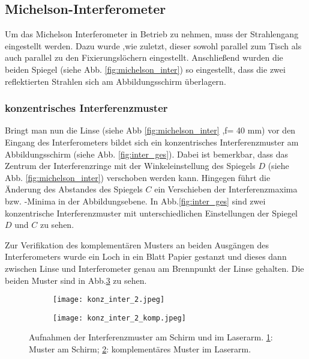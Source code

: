 \subsection{Michelson-Interferometer}
Um das Michelson Interferometer in Betrieb zu nehmen, muss der Strahlengang eingestellt werden.
Dazu wurde ,wie zuletzt, dieser sowohl parallel zum Tisch als auch parallel zu den Fixierungslöchern eingestellt.
Anschließend wurden die beiden Spiegel (siehe Abb. \ref{fig:michelson_inter}) so eingestellt, dass die zwei reflektierten Strahlen sich am Abbildungsschirm überlagern.
\subsubsection{konzentrisches Interferenzmuster}
Bringt man nun die Linse (siehe Abb \ref{fig:michelson_inter} ,f= 40 mm) vor den Eingang des Interferometers bildet sich ein konzentrisches Interferenzmuster am Abbildungsschirm (siehe Abb. \ref{fig:inter_ges}).
Dabei ist bemerkbar, dass das Zentrum der Interferenzringe mit der Winkeleinstellung des Spiegels $D$ (siehe Abb. \ref{fig:michelson_inter}) verschoben werden kann. 
Hingegen führt die Änderung des Abstandes des Spiegels $C$ ein Verschieben der Interferenzmaxima bzw. -Minima in der Abbildungsebene.
In Abb.\ref{fig:inter_ges} sind zwei konzentrische Interferenzmuster mit unterschiedlichen Einstellungen der Spiegel $D$ und $C$ zu sehen.

Zur Verifikation des komplementären Musters an beiden Ausgängen des Interferometers wurde ein Loch in ein Blatt Papier gestanzt und dieses dann zwischen Linse und Interferometer genau am Brennpunkt der Linse gehalten.
Die beiden Muster sind in Abb.\ref{fig:konz_inter_2} zu sehen.

\begin{figure}[H]
    \centering
    \begin{subfigure}[t]{0.45\textwidth}
        \texttt{[image: konz\_inter\_2.jpeg]}
        \caption{}
        \label{fig:konz_inter_2_schirm}
    \end{subfigure}
    \begin{subfigure}[t]{0.45\textwidth}
        \texttt{[image: konz\_inter\_2\_komp.jpeg]}
        \caption{}
        \label{fig:konz_inter_2_komp}
    \end{subfigure}

    \caption{
        Aufnahmen der Interferenzmuster am Schirm und im Laserarm.
        \ref{fig:konz_inter_2_schirm}: Muster am Schirm; 
        \ref{fig:konz_inter_2_komp}: komplementäres Muster im Laserarm.
    }
    \label{fig:konz_inter_2}
\end{figure}




